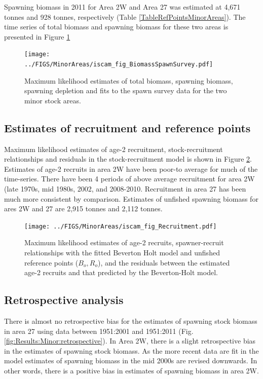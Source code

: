 Spawning biomass in 2011 for Area 2W and Area 27 was estimated at 4,671 tonnes and 928 tonnes, respectively (Table \ref{TableRefPointsMinorAreas}).  The time series of total biomass and spawning biomass for these two areas is presented in Figure \ref{Results:Minor:figBiomass}




\begin{figure}[!tbp]
	\texttt{[image: ../FIGS/MinorAreas/iscam\_fig\_BiomassSpawnSurvey.pdf]}\\
	\caption{Maximum likelihood estimates of total biomass, spawning biomass, spawning depletion and fits to the spawn survey data for the two minor stock areas.}\label{Results:Minor:figBiomass}
\end{figure}

\subsection{Estimates of recruitment and reference points}
Maximum likelihood estimates of age-2 recruitment, stock-recruitment relationships and residuals in the stock-recruitment model is shown in Figure \ref{Results:Minor:Recruitment}.  Estimates of age-2 recruits in area 2W have been poor-to average for much of the time-series.  There have been 4 periods of above average recruitment for area 2W (late 1970s, mid 1980s, 2002, and 2008-2010.  Recruitment in area 27 has been much more consistent by comparison.  Estimates of unfished spawning biomass for ares 2W and 27 are 2,915 tonnes and 2,112 tonnes.

\begin{figure}[!tbp]
	\texttt{[image: ../FIGS/MinorAreas/iscam\_fig\_Recruitment.pdf]}\\
	\caption{Maximum likelihood estimates of age-2 recruits, spawner-recruit relationships with the fitted Beverton Holt model and unfished reference points ($B_o, R_o$), and the residuals between the estimated age-2 recruits and that predicted by the Beverton-Holt model.}\label{Results:Minor:Recruitment}
\end{figure}

\subsection{Retrospective analysis}

There is almost no retrospective bias for the estimates of spawning stock biomass in area 27 using data between 1951:2001 and 1951:2011 (Fig. \ref{fig:Results:Minor:retrospective}).
In Area 2W, there is a slight retrospective bias in the estimates of spawning stock biomass.   As the more recent data are fit in the model estimates of spawning biomass in the mid 2000s are revised downwards.  In other words, there is a positive bias in estimates of spawning biomass in area 2W.


